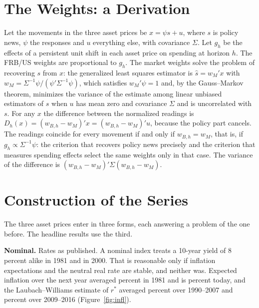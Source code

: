 \documentclass[11pt]{article}
\newcommand{\rs}{r^{*}}
\begin{document}
\FloatBarrier
\newpage
\begin{appendices}
\renewcommand{\thetable}{\Alph{section}\arabic{table}}
\renewcommand{\thefigure}{\Alph{section}\arabic{figure}}
\FloatBarrier

\section{The Weights: a Derivation}\label{app:ma}
Let the movements in the three asset prices be $x=\psi s+u$, where $s$ is policy news, $\psi$ the responses and $u$ everything else, with covariance $\Sigma$. Let $g_h$ be the effects of a persistent unit shift in each asset price on spending at horizon $h$. The FRB/US weights are proportional to $g_h$. The market weights solve the problem of recovering $s$ from $x$: the generalized least squares estimator is $\hat s=w_M'x$ with $w_M=\Sigma^{-1}\psi/(\psi'\Sigma^{-1}\psi)$, which satisfies $w_M'\psi=1$ and, by the Gauss--Markov theorem, minimizes the variance of the estimate among linear unbiased estimators of $s$ when $u$ has mean zero and covariance $\Sigma$ and is uncorrelated with $s$. For any $x$ the difference between the normalized readings is $D_h(x)=(w_{B,h}-w_M)'x=(w_{B,h}-w_M)'u$, because the policy part cancels. The readings coincide for every movement if and only if $w_{B,h}=w_M$, that is, if $g_h\propto\Sigma^{-1}\psi$: the criterion that recovers policy news precisely and the criterion that measures spending effects select the same weights only in that case. The variance of the difference is $(w_{B,h}-w_M)'\Sigma(w_{B,h}-w_M)$.


\section{Construction of the Series}\label{app:steps}
The three asset prices enter in three forms, each answering a problem of the one before. The headline results use the third.

\textbf{Nominal.} Rates as published. A nominal index treats a 10-year yield of 8 percent alike in 1981 and in 2000. That is reasonable only if inflation expectations and the neutral real rate are stable, and neither was. Expected inflation over the next year averaged  percent in 1981 and is  percent today, and the Laubach--Williams estimate of $\rs$ averaged  percent over 1990--2007 and  percent over 2009--2016 (Figure~\ref{fig:infl}).


\end{appendices}
\end{document}
